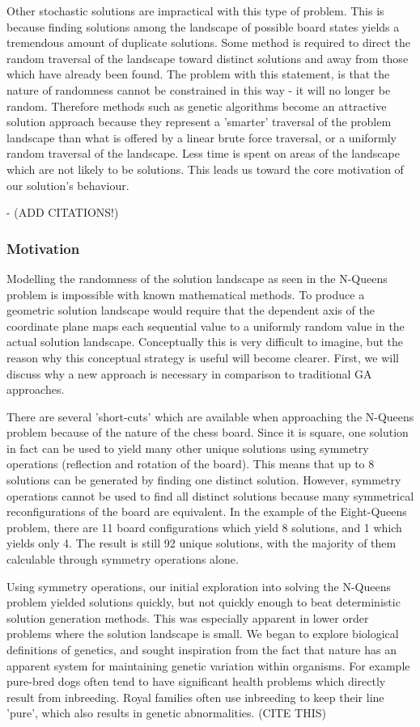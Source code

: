 \documentclass{sig-alternate}
\begin{document}
Other stochastic solutions are impractical with this type of problem. This is because finding solutions among the landscape of possible board states yields a tremendous amount of duplicate solutions. Some method is required to direct the random traversal of the landscape toward distinct solutions and away from those which have already been found. The problem with this statement, is that the nature of randomness cannot be constrained in this way - it will no longer be random. Therefore methods such as genetic algorithms become an attractive solution approach  because they represent a 'smarter' traversal of the problem landscape than what is offered by a linear brute force traversal, or a uniformly random traversal of the landscape. Less time is spent on areas of the landscape which are not likely to be solutions. This leads us toward the core motivation of our solution's behaviour.

- (ADD CITATIONS!)

\subsubsection{Motivation}
Modelling the randomness of the solution landscape as seen in the N-Queens problem is impossible with known mathematical methods. To produce a geometric solution landscape would require that the dependent axis of the coordinate plane maps each sequential value to a uniformly random value in the actual solution landscape. Conceptually this is very difficult to imagine, but the reason why this conceptual strategy is useful will become clearer. First, we will discuss why a new approach is necessary in comparison to traditional GA approaches.

There are several 'short-cuts' which are available when approaching the N-Queens problem because of the nature of the chess board. Since it is square, one solution in fact can be used to yield many other unique solutions using symmetry operations (reflection and rotation of the board). This means that up to 8 solutions can be generated by finding one distinct solution. However, symmetry operations cannot be used to find all distinct solutions because many symmetrical reconfigurations of the board are equivalent. In the example of the Eight-Queens problem, there are 11 board configurations which yield 8 solutions, and 1 which yields only 4. The result is still 92 unique solutions, with the majority of them calculable through symmetry operations alone.

Using symmetry operations, our initial exploration into solving the N-Queens problem yielded solutions quickly, but not quickly enough to beat deterministic solution generation methods. This was especially apparent in lower order problems where the solution landscape is small. We began to explore biological definitions of genetics, and sought inspiration from the fact that nature has an apparent system for maintaining genetic variation within organisms. For example pure-bred dogs often tend to have significant health problems which directly result from inbreeding. Royal families often use inbreeding to keep their line 'pure', which also results in genetic abnormalities. (CITE THIS)
\end{document}
